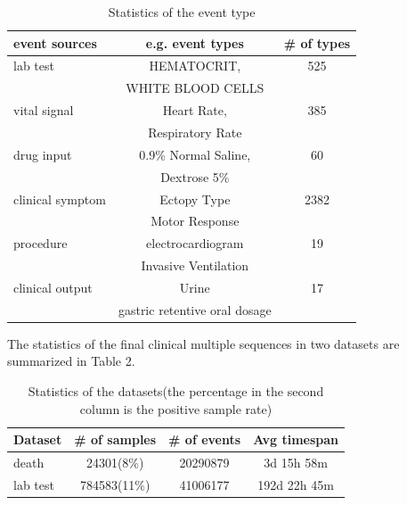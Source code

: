 \documentclass[letterpaper]{article} %
\begin{document}
\begin{table}[!t]
\renewcommand\arraystretch{1}
\centering
\begin{tabular}{|l|c|c|}
\hline
\textbf{event sources}        & \textbf{e.g. event types}  & \textbf{\# of types}    \\
\hline


lab test & HEMATOCRIT, & 525 \\
& WHITE BLOOD CELLS&\\
\hline %
vital signal      & Heart Rate, & 385\\
&Respiratory Rate&\\
\hline %
drug input & 0.9\% Normal Saline, & 60 \\
&Dextrose 5\%&\\
\hline %
clinical symptom     & Ectopy Type&2382\\
&Motor Response&\\
\hline %
procedure     & electrocardiogram & 19 \\
&Invasive Ventilation&\\
\hline %
clinical output      & Urine & 17\\
&gastric retentive oral dosage&\\
\hline %
\end{tabular}
\caption{Statistics of  the  event type}
\label{tab:some type multiple sequences}
\end{table}


The statistics of the final clinical multiple sequences in two datasets are summarized in Table 2.
\begin{table}[!t]
\renewcommand\arraystretch{1}
\centering
\begin{tabular}{|l|c|c|c|}
\hline
\textbf{Dataset}        & \textbf{\# of samples}  & \textbf{\# of events}    & \textbf{Avg timespan}\\
\hline

death      & 24301(8\%) & 20290879& 3d 15h 58m\\
\hline
lab test & 784583(11\%) & 41006177& 192d 22h 45m \\


\hline
\end{tabular}
\caption{Statistics of  the  datasets(the percentage in the second column is the positive sample rate)}
\label{tab:enropy}
\end{table}
\end{document}
